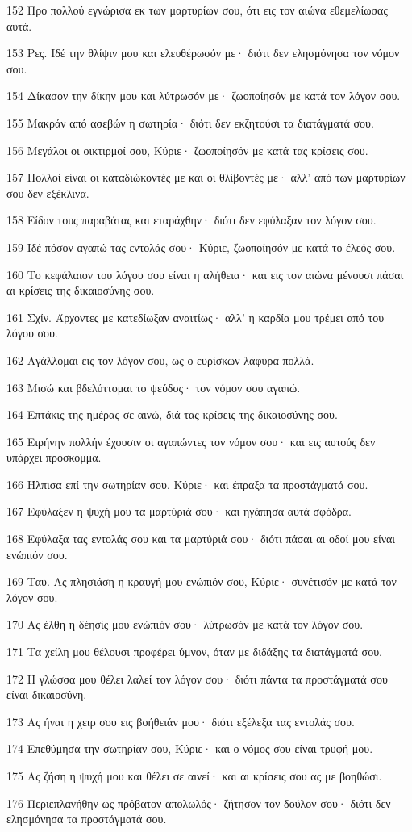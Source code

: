 \par 152 Προ πολλού εγνώρισα εκ των μαρτυρίων σου, ότι εις τον αιώνα εθεμελίωσας αυτά.
\par 153 Ρες. Ιδέ την θλίψιν μου και ελευθέρωσόν με· διότι δεν ελησμόνησα τον νόμον σου.
\par 154 Δίκασον την δίκην μου και λύτρωσόν με· ζωοποίησόν με κατά τον λόγον σου.
\par 155 Μακράν από ασεβών η σωτηρία· διότι δεν εκζητούσι τα διατάγματά σου.
\par 156 Μεγάλοι οι οικτιρμοί σου, Κύριε· ζωοποίησόν με κατά τας κρίσεις σου.
\par 157 Πολλοί είναι οι καταδιώκοντές με και οι θλίβοντές με· αλλ' από των μαρτυρίων σου δεν εξέκλινα.
\par 158 Είδον τους παραβάτας και εταράχθην· διότι δεν εφύλαξαν τον λόγον σου.
\par 159 Ιδέ πόσον αγαπώ τας εντολάς σου· Κύριε, ζωοποίησόν με κατά το έλεός σου.
\par 160 Το κεφάλαιον του λόγου σου είναι η αλήθεια· και εις τον αιώνα μένουσι πάσαι αι κρίσεις της δικαιοσύνης σου.
\par 161 Σχίν. Άρχοντες με κατεδίωξαν αναιτίως· αλλ' η καρδία μου τρέμει από του λόγου σου.
\par 162 Αγάλλομαι εις τον λόγον σου, ως ο ευρίσκων λάφυρα πολλά.
\par 163 Μισώ και βδελύττομαι το ψεύδος· τον νόμον σου αγαπώ.
\par 164 Επτάκις της ημέρας σε αινώ, διά τας κρίσεις της δικαιοσύνης σου.
\par 165 Ειρήνην πολλήν έχουσιν οι αγαπώντες τον νόμον σου· και εις αυτούς δεν υπάρχει πρόσκομμα.
\par 166 Ήλπισα επί την σωτηρίαν σου, Κύριε· και έπραξα τα προστάγματά σου.
\par 167 Εφύλαξεν η ψυχή μου τα μαρτύριά σου· και ηγάπησα αυτά σφόδρα.
\par 168 Εφύλαξα τας εντολάς σου και τα μαρτύριά σου· διότι πάσαι αι οδοί μου είναι ενώπιόν σου.
\par 169 Ταυ. Ας πλησιάση η κραυγή μου ενώπιόν σου, Κύριε· συνέτισόν με κατά τον λόγον σου.
\par 170 Ας έλθη η δέησίς μου ενώπιόν σου· λύτρωσόν με κατά τον λόγον σου.
\par 171 Τα χείλη μου θέλουσι προφέρει ύμνον, όταν με διδάξης τα διατάγματά σου.
\par 172 Η γλώσσα μου θέλει λαλεί τον λόγον σου· διότι πάντα τα προστάγματά σου είναι δικαιοσύνη.
\par 173 Ας ήναι η χειρ σου εις βοήθειάν μου· διότι εξέλεξα τας εντολάς σου.
\par 174 Επεθύμησα την σωτηρίαν σου, Κύριε· και ο νόμος σου είναι τρυφή μου.
\par 175 Ας ζήση η ψυχή μου και θέλει σε αινεί· και αι κρίσεις σου ας με βοηθώσι.
\par 176 Περιεπλανήθην ως πρόβατον απολωλός· ζήτησον τον δούλον σου· διότι δεν ελησμόνησα τα προστάγματά σου.

